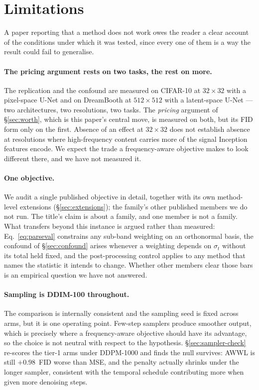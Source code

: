 \section{Limitations}
\label{sec:limitations}

A paper reporting that a method does not work owes the reader a clear account
of the conditions under which it was tested, since every one of them is a way
the result could fail to generalise.

\paragraph{The pricing argument rests on two tasks, the rest on more.}
The replication and the confound are measured on CIFAR-10 at $32\times32$ with
a pixel-space U-Net and on DreamBooth at $512\times512$ with a latent-space
U-Net --- two architectures, two resolutions, two tasks. The \emph{pricing}
argument of \S\ref{sec:worth}, which is this paper's central move, is measured
on both, but its FID form only on the first. Absence of an effect at
$32\times32$ does not establish absence at resolutions where high-frequency
content carries more of the signal Inception features encode. We expect the
trade a frequency-aware objective makes to look different there, and we have
not measured it.

\paragraph{One objective.}
We audit a single published objective in detail, together with its own
method-level extensions (\S\ref{sec:extensions}); the family's other
published members we do not run. The title's claim is about a
family, and one member is not a family. What transfers beyond this instance is
argued rather than measured: Eq.~\ref{eq:parseval} constrains any sub-band
weighting on an orthonormal basis, the confound of \S\ref{sec:confound} arises
whenever a weighting depends on $\sigma_t$ without its total held fixed, and
the post-processing control applies to any method that names the statistic it
intends to change. Whether other members clear those bars is an empirical
question we have not answered.

\paragraph{Sampling is DDIM-100 throughout.}
The comparison is internally consistent and the sampling seed is fixed across
arms, but it is one operating point. Few-step samplers produce smoother output,
which is precisely where a frequency-aware objective should have its advantage,
so the choice is not neutral with respect to the hypothesis.
\S\ref{sec:sampler-check} re-scores the tier-1 arms under DDPM-1000 and
finds the null survives: AWWL is still $+0.98$~FID worse than MSE, and the
penalty actually shrinks under the longer sampler, consistent with the
temporal schedule contributing more when given more denoising steps.


